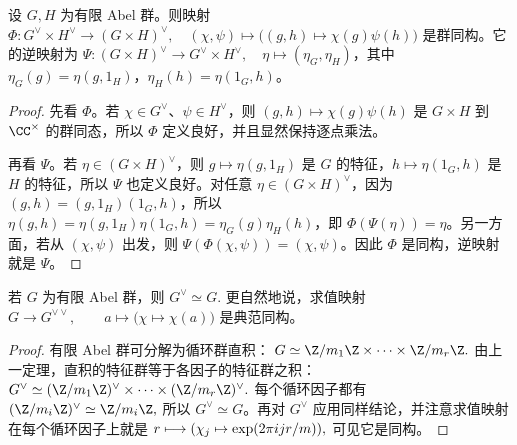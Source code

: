 \begin{theorem}[直积的对偶群]
设 $G,H$ 为有限 Abel 群。则映射
\(\Phi:G^\vee\times H^\vee\longrightarrow (G\times H)^\vee,\quad
(\chi,\psi)\longmapsto\bigl((g,h)\mapsto \chi(g)\psi(h)\bigr)\)
是群同构。它的逆映射为
\(\Psi:(G\times H)^\vee\longrightarrow G^\vee\times H^\vee,\quad
\eta\longmapsto(\eta_G,\eta_H)\)，其中
\(\eta_G(g)=\eta(g,1_H)\)，\(\eta_H(h)=\eta(1_G,h)\)。
\end{theorem}

\begin{proof}
先看 \(\Phi\)。若 \(\chi\in G^\vee\)、\(\psi\in H^\vee\)，则 \((g,h)\mapsto \chi(g)\psi(h)\) 是 \(G\times H\) 到 \(\C^\times\) 的群同态，所以 \(\Phi\) 定义良好，并且显然保持逐点乘法。

再看 \(\Psi\)。若 \(\eta\in (G\times H)^\vee\)，则 \(g\mapsto\eta(g,1_H)\) 是 \(G\) 的特征，\(h\mapsto\eta(1_G,h)\) 是 \(H\) 的特征，所以 \(\Psi\) 也定义良好。对任意 \(\eta\in (G\times H)^\vee\)，因为 \((g,h)=(g,1_H)(1_G,h)\)，所以 \(\eta(g,h)=\eta(g,1_H)\eta(1_G,h)=\eta_G(g)\eta_H(h)\)，即 \(\Phi(\Psi(\eta))=\eta\)。另一方面，若从 \((\chi,\psi)\) 出发，则 \(\Psi(\Phi(\chi,\psi))=(\chi,\psi)\)。因此 \(\Phi\) 是同构，逆映射就是 \(\Psi\)。
\end{proof}

\begin{theorem}
若 $G$ 为有限 Abel 群，则
\(
  G^\vee\simeq G.
\)
更自然地说，求值映射
\(
  G\longrightarrow G^{\vee\vee},\qquad
  a\longmapsto\bigl(\chi\mapsto \chi(a)\bigr)
\)
是典范同构。
\end{theorem}

\begin{proof}
有限 Abel 群可分解为循环群直积：
\(
  G\simeq \Cyc{m_1}\times\cdots\times \Cyc{m_r}.
\)
由上一定理，直积的特征群等于各因子的特征群之积：
\(
  G^\vee\simeq
  (\Cyc{m_1})^\vee\times\cdots\times(\Cyc{m_r})^\vee.
\)
每个循环因子都有
\(
  (\Cyc{m_i})^\vee\simeq \Cyc{m_i},
\)
所以 $G^\vee\simeq G$。再对 $G^\vee$ 应用同样结论，并注意求值映射在每个循环因子上就是
\(
  r\longmapsto(\chi_j\mapsto \exp(2\pi i jr/m)),
\)
可见它是同构。
\end{proof}

